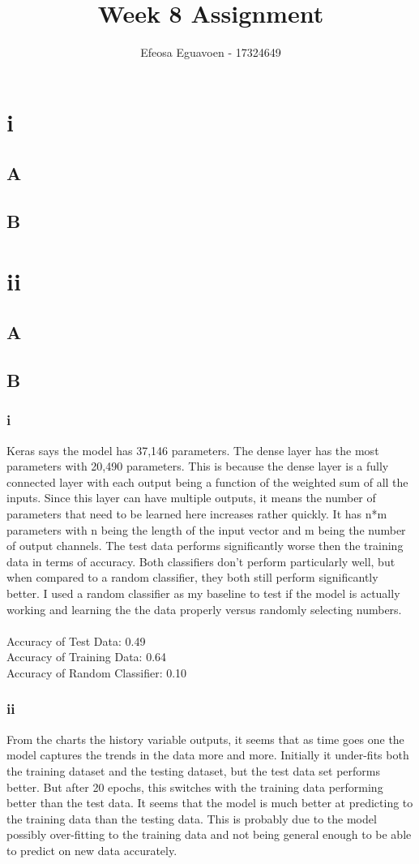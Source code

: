 \documentclass[11pt]{article} %
\title{Week 8 Assignment}
\author{Efeosa Eguavoen - 17324649}
\begin{document}
\maketitle

\section{i}
\subsection{A}
\subsection{B}
\section{ii}
\subsection{A}
\subsection{B}
\subsubsection{i}
Keras says the model has 37,146 parameters.  The dense layer has the most parameters with 20,490 parameters.  This is because the dense layer is a fully connected layer with each output being a function of the weighted sum of all the inputs. Since this layer can have multiple outputs, it means the number of parameters that need to be learned here increases rather quickly.  It has n*m parameters with n being the length of the input vector and m being the number of output channels. The test data performs significantly worse then the training data in terms of accuracy.  Both classifiers don't perform particularly well,  but when compared to a random classifier, they both still perform significantly better.  I used a random classifier as my baseline to test if the model is actually working and learning the the data properly versus randomly selecting numbers.
\\\\ Accuracy of Test Data: 0.49
\\ Accuracy of Training Data: 0.64
\\ Accuracy of Random Classifier: 0.10
\subsubsection{ii}
From the charts the history variable outputs, it seems that as time goes one the model captures the trends in the data more and more.  Initially it under-fits both the training dataset and the testing dataset, but the test data set performs better.  But after 20 epochs, this switches with the training data performing better than the test data. It seems that the model is much better at predicting to the training data than the testing data.  This is probably due to the model possibly over-fitting to the training data and not being general enough to be able to predict on new data accurately.
\end{document}
